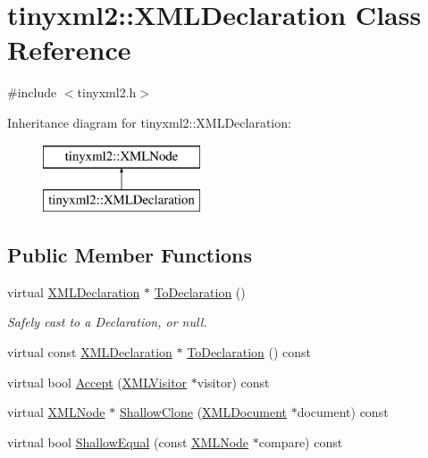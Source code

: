 \hypertarget{classtinyxml2_1_1_x_m_l_declaration}{}\section{tinyxml2\+:\+:X\+M\+L\+Declaration Class Reference}
\label{classtinyxml2_1_1_x_m_l_declaration}


{\ttfamily \#include $<$tinyxml2.\+h$>$}

Inheritance diagram for tinyxml2\+:\+:X\+M\+L\+Declaration\+:\begin{figure}[H]
\begin{center}
\leavevmode
\includegraphics[height=2.000000cm]{classtinyxml2_1_1_x_m_l_declaration}
\end{center}
\end{figure}
\subsection*{Public Member Functions}
\begin{DoxyCompactItemize}
\item 
virtual \mbox{\hyperlink{classtinyxml2_1_1_x_m_l_declaration}{X\+M\+L\+Declaration}} $\ast$ \mbox{\hyperlink{classtinyxml2_1_1_x_m_l_declaration_a159d8ac45865215e88059ea1e5b52fc5}{To\+Declaration}} ()
\begin{DoxyCompactList}\small\item\em Safely cast to a Declaration, or null. \end{DoxyCompactList}\item 
virtual const \mbox{\hyperlink{classtinyxml2_1_1_x_m_l_declaration}{X\+M\+L\+Declaration}} $\ast$ \mbox{\hyperlink{classtinyxml2_1_1_x_m_l_declaration_aa20c3315b18c3b88830dccf5c493259b}{To\+Declaration}} () const
\item 
virtual bool \mbox{\hyperlink{classtinyxml2_1_1_x_m_l_declaration_acf47629d9fc08ed6f1c164a97bcf794b}{Accept}} (\mbox{\hyperlink{classtinyxml2_1_1_x_m_l_visitor}{X\+M\+L\+Visitor}} $\ast$visitor) const
\item 
virtual \mbox{\hyperlink{classtinyxml2_1_1_x_m_l_node}{X\+M\+L\+Node}} $\ast$ \mbox{\hyperlink{classtinyxml2_1_1_x_m_l_declaration_ad9d60e6d2df75c13eb6bf7319985b747}{Shallow\+Clone}} (\mbox{\hyperlink{classtinyxml2_1_1_x_m_l_document}{X\+M\+L\+Document}} $\ast$document) const
\item 
virtual bool \mbox{\hyperlink{classtinyxml2_1_1_x_m_l_declaration_ae8b4d3a399857029f36c322b0801b69c}{Shallow\+Equal}} (const \mbox{\hyperlink{classtinyxml2_1_1_x_m_l_node}{X\+M\+L\+Node}} $\ast$compare) const
\end{DoxyCompactItemize}
